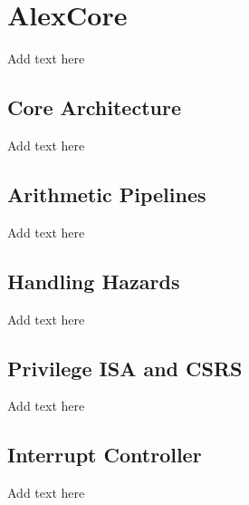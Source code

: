 \documentclass[../main.tex]{subfiles}
\begin{document}
\section{AlexCore}
Add text here

\subsection{Core Architecture}
Add text here

\subsection{Arithmetic Pipelines}
Add text here

\subsection{Handling Hazards}
Add text here

\subsection{Privilege ISA and CSRS}
Add text here

\subsection{Interrupt Controller}
Add text here
\end{document}
